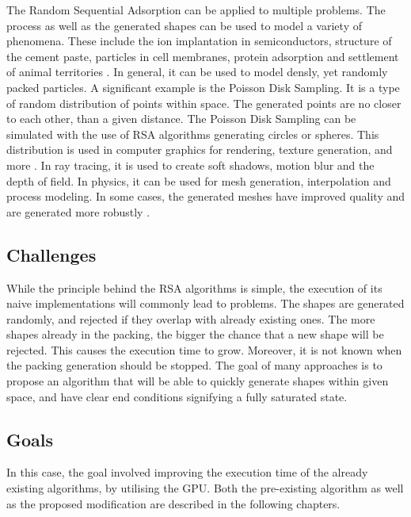 \documentclass[12pt, oneside]{report}
\begin{document}
The Random Sequential Adsorption can be applied to multiple problems. The process as well as the generated shapes can be used to model a variety of phenomena. These include the ion implantation in semiconductors, structure of the cement paste, particles in cell membranes, protein adsorption and settlement of animal territories \cite{zhang}. In general, it can be used to model densly, yet randomly packed particles.\newline \newline
A significant example is the Poisson Disk Sampling. It is a type of random distribution of points within space. The generated points are no closer to each other, than a given distance. The Poisson Disk Sampling can be simulated with the use of RSA algorithms generating circles or spheres. This distribution is used in computer graphics for rendering, texture generation, and more \cite{ebeida}. In ray tracing, it is used to create soft shadows, motion blur and the depth of field. In physics, it can be used for mesh generation, interpolation and process modeling. In some cases, the generated meshes have improved quality and are generated more robustly \cite{ebeida}.

\subsection {Challenges}

While the principle behind the RSA algorithms is simple, the execution of its naive implementations will commonly lead to problems. The shapes are generated randomly, and rejected if they overlap with already existing ones. The more shapes already in the packing, the bigger the chance that a new shape will be rejected. This causes the execution time to grow. Moreover, it is not known when the packing generation should be stopped. The goal of many approaches is to propose an algorithm that will be able to quickly generate shapes within given space, and have clear end conditions signifying a fully saturated state.

\subsection {Goals}

In this case, the goal involved improving the execution time of the already existing algorithms, by utilising the GPU. Both the pre-existing algorithm as well as the proposed modification are described in the following chapters.
\end{document}
